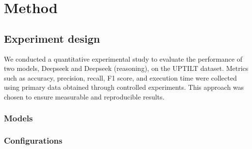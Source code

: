 \section{Method}
%
%
%

\subsection{Experiment design}
%
%
%
%
We conducted a quantitative experimental study to evaluate the performance of two
models, Deepseek and Deepseek (reasoning), on the UPTILT dataset. Metrics such
as accuracy, precision, recall, F1 score, and execution time were collected
using primary data obtained through controlled experiments. This approach was chosen
to ensure measurable and reproducible results.
%

\subsubsection{Models}
%

\subsubsection{Configurations}
%

